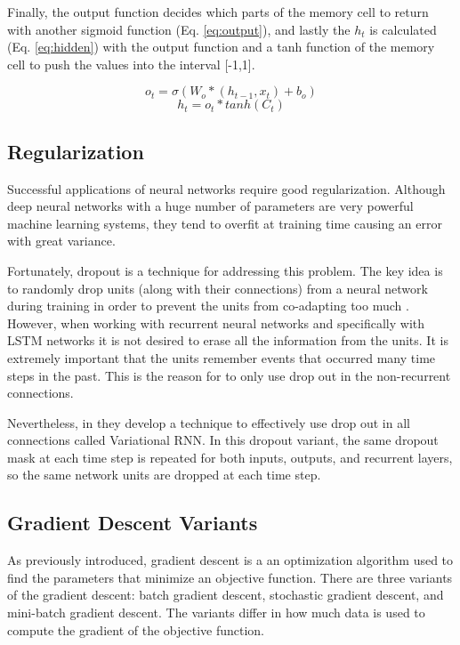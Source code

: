 Finally, the output function decides which parts of the memory cell to return with another sigmoid function (Eq. \ref{eq:output}), and lastly the $h_t$ is calculated (Eq. \ref{eq:hidden}) with the output function and a tanh function of the memory cell to push the values into the interval [-1,1].

\begin{equation} \label{eq:output}
o_t=\sigma(W_o*(h_{t-1},x_t)+b_o)
\end{equation}
\begin{equation} \label{eq:hidden}
h_t=o_t*tanh(C_t)
\end{equation}

\subsection{Regularization}

Successful applications of neural networks require good regularization. Although deep neural networks with a huge number of parameters are very powerful machine learning systems, they tend to overfit at training time causing an error with great variance. 

Fortunately, dropout is a technique for addressing this problem. The key idea is to randomly drop units (along with their connections) from a neural network during training in order to prevent the units from co-adapting too much \cite{srivastava2013improving}. However, when working with recurrent neural networks and specifically with LSTM networks it is not desired to erase all the information from the units. It is extremely important that the units remember events that occurred many time steps in the past. This is the reason for \cite{zaremba2014recurrent} to only use drop out in the non-recurrent connections. 

Nevertheless, in \cite{gal2015theoretically} they develop a technique to effectively use drop out in all connections called Variational RNN. In this dropout variant, the same dropout mask at each time step is repeated for both inputs, outputs, and recurrent layers, so the same network units are dropped at each time step. 

\subsection{Gradient Descent Variants}
As previously introduced, gradient descent is a an optimization algorithm used to find the parameters that minimize an objective function. There are three variants of the gradient descent: batch gradient descent, stochastic gradient descent, and mini-batch gradient descent. The variants differ in how much data is used to compute the gradient of the objective function. 

